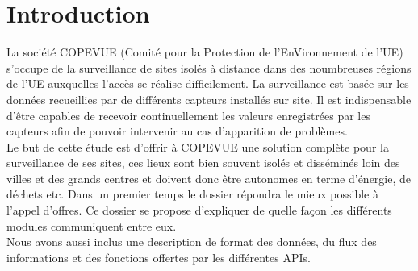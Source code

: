 \section{Introduction}

La société COPEVUE (Comité pour la Protection de l’EnVironnement de l’UE) 
s’occupe de la surveillance de sites isolés à distance dans des noumbreuses 
régions de l'UE auxquelles l’accès se réalise difficilement. La surveillance est 
basée sur les données recueillies par de différents capteurs installés sur site. 
Il est indispensable d’être capables de recevoir continuellement les valeurs 
enregistrées par les capteurs afin de pouvoir intervenir au cas d’apparition de 
problèmes. \\
Le but de cette étude est d’offrir à COPEVUE une solution complète pour la 
surveillance de ses sites, ces lieux sont bien souvent isolés et disséminés 
loin des villes et des grands centres et doivent donc être autonomes en terme 
d’énergie, de déchets etc.
Dans un premier temps le dossier répondra le mieux possible à l’appel d’offres. 
Ce dossier se propose d’expliquer de quelle façon les différents modules 
communiquent entre eux. \\
Nous avons aussi inclus une description de format des données, du flux des 
informations et des fonctions offertes par les différentes APIs.

\vfill
\pagebreak
